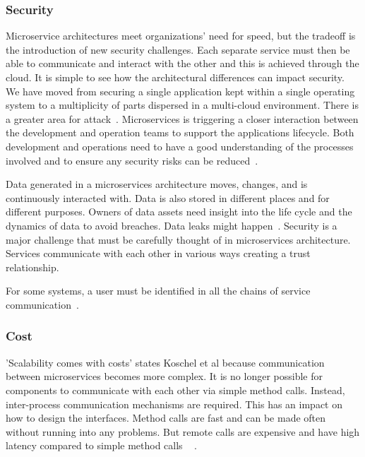 \subsubsection{Security}%

Microservice architectures meet organizations' need for speed, but the tradeoff is the introduction of new security challenges. Each separate service must then be able to communicate and interact with the other and this is achieved through the cloud. It is simple to see how the architectural differences can impact security. We have moved from securing a single application kept within a single operating system to a multiplicity of parts dispersed in a multi-cloud environment. There is a greater area for attack~\cite{Zaytev2018}. Microservices is triggering a closer interaction between the development and operation teams to support the applications lifecycle. Both development and operations need to have a good understanding of the processes involved and to ensure any security risks can be reduced~\cite{Aaron2018,Amazon,Gonchar2017}. 

\par Data generated in a microservices architecture moves, changes, and is continuously interacted with. Data is also stored in different places and for different purposes. Owners of data assets need insight into the life cycle and the dynamics of data to avoid breaches. Data leaks might happen~\cite{tenev2019}. Security is a major challenge that must be carefully thought of in microservices architecture. Services communicate with each other in various ways creating a trust relationship. 

\par For some systems, a user must be identified in all the chains of service communication~\cite{Monterio2018}.

\subsubsection{Cost}%
'Scalability comes with costs' states Koschel et al because communication between microservices becomes more complex. It is no longer possible for components to communicate with each other via simple method calls. Instead, inter-process communication mechanisms are required. This has an impact on how to design the interfaces. Method calls are fast and can be made often without running into any problems. But remote calls are expensive and have high latency compared to simple method calls ~\cite{Koschel2017} \cite{McElhiney2018}. 

